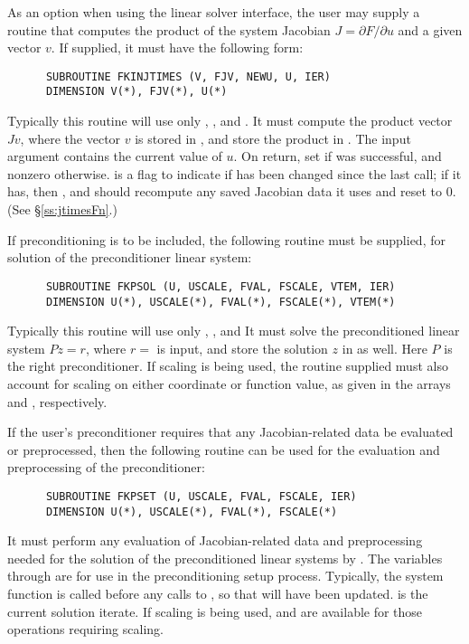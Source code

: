 \begin{Steps}
  As an option when using the {\kinspils} linear solver interface, 
  the user may supply a routine that computes the product of the system Jacobian 
  $J = \partial F / \partial u$ 
  and a given vector $v$.  If supplied, it must have the following form:
\begin{verbatim}
      SUBROUTINE FKINJTIMES (V, FJV, NEWU, U, IER)
      DIMENSION V(*), FJV(*), U(*)
\end{verbatim}
  Typically this routine will use only , , and .
  It must compute the product vector $Jv$, where the vector $v$ is
  stored in , and store the product in .  
  The input argument  contains the current value of $u$.  On return, set
   if  was successful, and nonzero otherwise.
   is a flag to indicate if  has been changed since the last
  call; if it has, then , and  should recompute any
  saved Jacobian data it uses and reset  to 0.  (See \S\ref{ss:jtimesFn}.)

  If preconditioning is to be included, the following routine must be
  supplied, for solution of the preconditioner linear system:
\begin{verbatim}
      SUBROUTINE FKPSOL (U, USCALE, FVAL, FSCALE, VTEM, IER)
      DIMENSION U(*), USCALE(*), FVAL(*), FSCALE(*), VTEM(*)
\end{verbatim}
  Typically this routine will use only , , and 
  It must solve the preconditioned linear system $Pz = r$, where
  $r = $  is input, and store the solution $z$ in  as well. 
  Here $P$ is the right preconditioner. If scaling is being used, the
  routine supplied must also account for scaling on either coordinate
  or function value, as given in the arrays  and
  , respectively.
  
  If the user's preconditioner requires that any Jacobian-related data be evaluated
  or preprocessed, then the following routine can be used for the evaluation and
  preprocessing of the preconditioner:
\begin{verbatim}
      SUBROUTINE FKPSET (U, USCALE, FVAL, FSCALE, IER)
      DIMENSION U(*), USCALE(*), FVAL(*), FSCALE(*)
\end{verbatim}
  It must perform any evaluation of Jacobian-related data and
  preprocessing needed for the solution of the preconditioned linear
  systems by . The variables  through  are for use in the
  preconditioning setup process. Typically, the system function  is
  called before any calls to , so that  will have
  been updated.  is the current solution
  iterate. 
  If scaling is being used,  and  are available for those operations
  requiring scaling.
  

\end{Steps}
